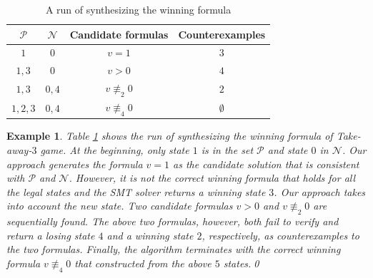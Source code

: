 \documentclass[review]{elsarticle}
\newcommand{\tuple}[1]{\langle {#1} \rangle}
\newcommand{\statevar}{\mathcal{X}}
\newcommand{\positiveSet}{\mathcal{P}}
\newcommand{\negativeSet}{\mathcal{N}}
\newcommand{\act}{\mathcal{A}}
\newcommand{\constraint}{\mathcal{C}}
\newcommand{\estate}{\mathcal{E}}
\newcommand{\nmodulo}{\not \equiv}
\newtheorem{example}{Example}
\newtheorem{theorem}{Theorem}
\begin{document}
        
        \begin{table}[!t]        	
		\small
        \centering        	
        	\begin{tabular}{|c|c|c|c|}
        		\hline
        		$\positiveSet$ & $\negativeSet$ & Candidate formulas & Counterexamples \\ \hline
        		$1$ & $0$ & $v = 1$ & $3$ \\ \hline
        		$1, 3$ & $0$ & $v > 0$ & $4$ \\ \hline
        		$1, 3$ & $0,4$ & $v \nmodulo_2 0$ & $2$\\ \hline
        		$1, 2, 3$ & $0,4$ & $v \nmodulo_4 0$ & $\emptyset$\\ \hline
        	\end{tabular}
        	\caption{A run of synthesizing the winning formula}
        	\label{table:synWinForm}
        \end{table}

%    	
%
    
        \begin{example} \label{exm:synWinForm} \rm 
        Table \ref{table:synWinForm} shows the run of synthesizing the winning formula of Take-away-$3$ game.
        At the beginning, only state $1$ is in the set $\positiveSet$ and state $0$ in $\negativeSet$.
		Our approach generates the formula $v = 1$ as the candidate solution that is consistent with $\positiveSet$ and $\negativeSet$.
		However, it is not the correct winning formula that holds for all the legal states and the SMT solver returns a winning state $3$.
		Our approach takes into account the new state.
		Two candidate formulas $v > 0$ and $v \nmodulo_2 0$ are sequentially found.
		The above two formulas, however, both fail to verify and return a losing state $4$ and a winning state $2$, respectively, as counterexamples to the two formulas.
        Finally, the algorithm terminates with the correct winning formula $v \nmodulo_4 0$ that constructed from the above $5$ states.\qed
        \end{example}
        
\end{document}
